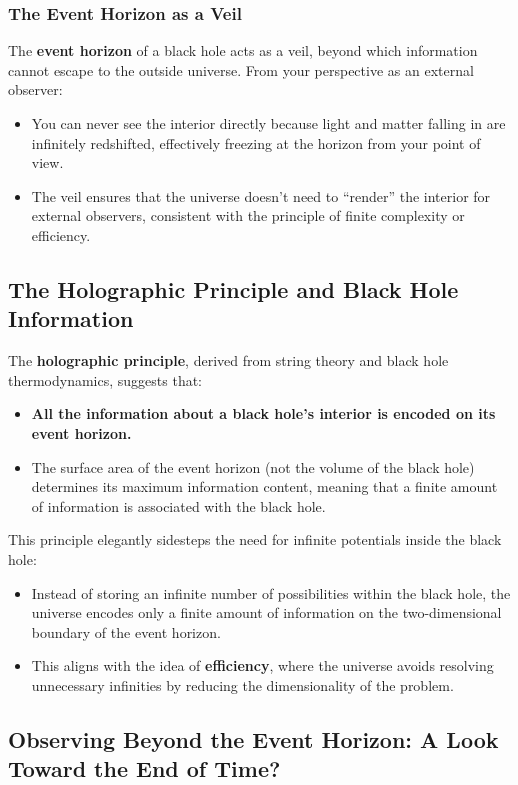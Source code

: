 \documentclass[12pt]{article}
\begin{document}
\subsubsection{The Event Horizon as a Veil}

The \textbf{event horizon} of a black hole acts as a veil, beyond which information cannot escape to the outside universe. From your perspective as an external observer:
\begin{itemize}
    \item You can never see the interior directly because light and matter falling in are infinitely redshifted, effectively freezing at the horizon from your point of view.
    \item The veil ensures that the universe doesn't need to ``render'' the interior for external observers, consistent with the principle of finite complexity or efficiency.
\end{itemize}

\subsection{The Holographic Principle and Black Hole Information}

The \textbf{holographic principle}, derived from string theory and black hole thermodynamics, suggests that:
\begin{itemize}
    \item \textbf{All the information about a black hole's interior is encoded on its event horizon.}
    \item The surface area of the event horizon (not the volume of the black hole) determines its maximum information content, meaning that a finite amount of information is associated with the black hole.
\end{itemize}

This principle elegantly sidesteps the need for infinite potentials inside the black hole:
\begin{itemize}
    \item Instead of storing an infinite number of possibilities within the black hole, the universe encodes only a finite amount of information on the two-dimensional boundary of the event horizon.
    \item This aligns with the idea of \textbf{efficiency}, where the universe avoids resolving unnecessary infinities by reducing the dimensionality of the problem.
\end{itemize}

\subsection{Observing Beyond the Event Horizon: A Look Toward the End of Time?}
\end{document}

